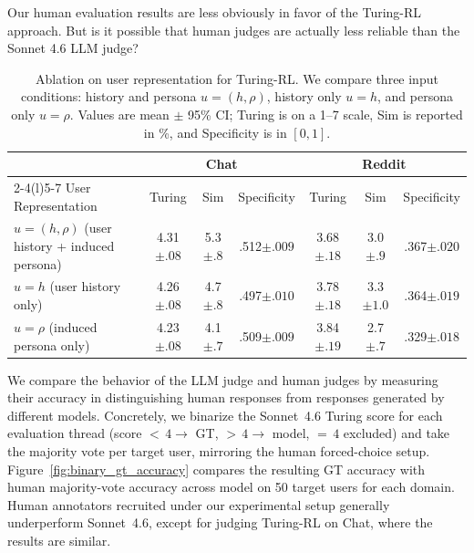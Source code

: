 \documentclass[11pt]{article}
\newcommand{\subtle}[1]{{\tiny\color[gray]{0.4}#1}}
\newcommand{\llq}[1]{{\color{cyan}[linlu: #1]}}
\begin{document}
Our human evaluation results are less obviously in favor of the Turing-RL approach. But is it possible that human judges are actually less reliable than the Sonnet 4.6 LLM judge?

\begin{table}[t]
\centering
\small
\setlength{\tabcolsep}{6pt}
\begin{tabular*}{\textwidth}{@{\extracolsep{\fill}}lcccccc@{}}
\toprule
\multirow{2}{*}{} & \multicolumn{3}{c}{Chat} & \multicolumn{3}{c}{Reddit} \\
\cmidrule(lr){2-4}\cmidrule(l){5-7}
User Representation & Turing & Sim & Specificity & Turing & Sim & Specificity \\
\midrule
$u = (h, \rho)$ (user history + induced persona) & 4.31\subtle{$\pm .08$} & 5.3\subtle{$\pm .8$} & .512\subtle{$\pm .009$} & {3.68}\subtle{$\pm .18$} & 3.0\subtle{$\pm .9$} & .367\subtle{$\pm .020$} \\
$u = h$ (user history only)      & 4.26\subtle{$\pm .08$} & 4.7\subtle{$\pm .8$} & {.497}\subtle{$\pm .010$} & 3.78\subtle{$\pm .18$} & 3.3\subtle{$\pm 1.0$} & .364\subtle{$\pm .019$} \\
 $u = \rho$ (induced persona only)    & {4.23}\subtle{$\pm .08$} & {4.1}\subtle{$\pm .7$} & .509\subtle{$\pm .009$} & 3.84\subtle{$\pm .19$} & {2.7}\subtle{$\pm .7$} & {.329}\subtle{$\pm .018$} \\
\bottomrule
\end{tabular*}
\vspace{-0.3cm}
\caption{Ablation on user representation for Turing-RL. We compare three input conditions: history and persona $u = (h, \rho)$, history only $u = h$, and persona only $u = \rho$.  Values are mean $\pm$ 95\% CI; Turing is on a 1--7 scale, Sim is reported in \%, and Specificity is in $[0,1]$.}
\label{tab:ablation_combined}
\vspace{-0.2cm}
\end{table}

We compare the behavior of the LLM judge and human judges by measuring their accuracy in distinguishing human responses from responses generated by different models. Concretely, we binarize the Sonnet~4.6 Turing score for each evaluation thread (score ${<}\,4 \to$ GT, ${>}\,4 \to$ model, ${=}\,4$ excluded) and take the majority vote per target user, mirroring the human forced-choice setup.  Figure~\ref{fig:binary_gt_accuracy} compares the resulting GT accuracy with human majority-vote accuracy across model on 50 target users for each domain. Human annotators recruited under our experimental setup generally underperform Sonnet~4.6, except for judging Turing-RL on Chat, where the results are similar. 
\end{document}
